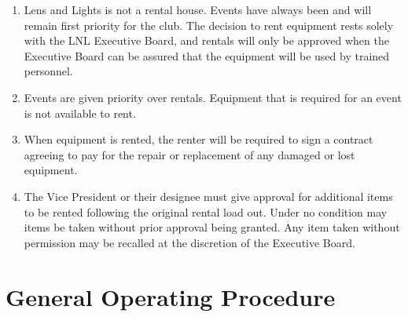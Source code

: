 \documentclass[12pt,letterpaper,oneside]{book}
\begin{document}
\begin{enumerate}

\item Lens and Lights is not a rental house. Events have always been and will remain first priority for the club. The decision to rent equipment rests solely with the LNL Executive Board, and rentals will only be approved when the Executive Board can be assured that the equipment will be used by trained personnel.
\item Events are given priority over rentals. Equipment that is required for an event is not available to rent.
\item When equipment is rented, the renter will be required to sign a contract agreeing to pay for the repair or replacement of any damaged or lost equipment.
\item The Vice President or their designee must give approval for additional items to be rented following the original rental load out. Under no condition may items be taken without prior approval being granted. Any item taken without permission may be recalled at the discretion of the Executive Board.

\end{enumerate}

\section{General Operating Procedure}
\end{document}
